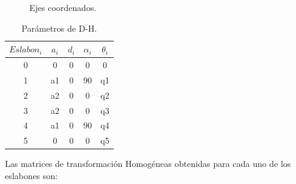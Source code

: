 \begin{figure}[h]
	\centering
		\caption{Ejes coordenados.}\label{fig:DH}
\end{figure}

\begin{table}[h]
	\centering
		\begin{tabular}{|c|c|c|c|c|}
		\hline
			$Eslabon_{i}$	&	$a_{i}$	&	$d_{i}$	&	$\alpha_{i}$ & $\theta_{i}$	\\
			\hline
			0	&	0	&	0	&	0	&	0	\\
			\hline
			1&a1&0&90&q1\\
			\hline
			2&a2&0&0&q2\\
			\hline
			3&a2&0&0&q3\\
			\hline
			4&a1&0&90&q4\\
			\hline
			5&0&0&0&q5\\
			\hline
		\end{tabular}
	\caption{Parámetros de D-H.}
	\label{tab:DH}
\end{table}

Las matrices de transformación Homogéneas obtenidas para cada uno de los eslabones son:\\

